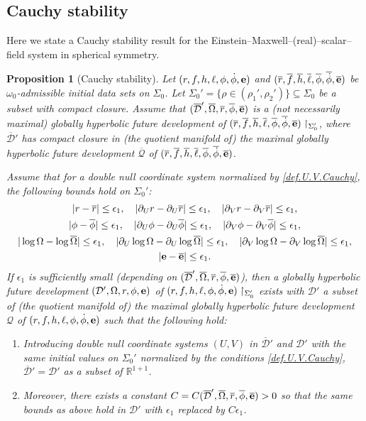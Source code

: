 \documentclass[10pt, reqno]{amsart}
\newtheorem{proposition}[theorem]{Proposition}
\theoremstyle{definition}
\theoremstyle{remark}
\theoremstyle{conjecture}
\numberwithin{equation}{section}
\newcommand{\abs}[1]{\vert#1\vert}
\newcommand{\set}[1]{\{#1\}}
\newcommand{\rd}{\partial}
\newcommand{\0}{\emptyset}
\newcommand{\eps}{\epsilon}
\newcommand{\Sgm}{\Sigma}
\newcommand{\omg}{\omega}
\newcommand{\Omg}{\Omega}
\newcommand{\bfe}{{\bf e}}
\newcommand{\calD}{\mathcal D}
\newcommand{\calQ}{\mathcal Q}
\newcommand{\e}{\bfe}							%
\newcommand{\Omgbg}{\overline{\Omg}}				%
\newcommand{\phibg}{\overline{\phi}}				%
\newcommand{\rbg}{\overline{r}}					%
\newcommand{\ebg}{\overline{\e}}					%
\newcommand{\fbg}{\overline{f}}
\newcommand{\hbg}{\overline{h}}
\newcommand{\ellbg}{\overline{\ell}}
\newcommand{\dphibg}{\overline{\dot{\phi}}}
\begin{document}
\subsection{Cauchy stability} \label{subsec:cauchy-st}
Here we state a Cauchy stability result for the Einstein--Maxwell--(real)--scalar--field system in spherical symmetry.
\begin{proposition}[Cauchy stability] \label{prop:cauchy-st}
Let $(r, f, h, \ell, \phi, \dot{\phi}, \e)$ and $(\rbg, \fbg, \hbg, \ellbg, \phibg, \dphibg, \ebg)$ be $\omg_0$-admissible initial data sets on $\Sgm_{0}$. Let $\Sgm_{0}' = \set{ \rho \in (\rho_{1}', \rho_{2}')} \subseteq \Sigma_0$ be a subset with compact closure. Assume that $(\overline{\calD}', \Omgbg, \rbg, \phibg, \ebg)$ is a (not necessarily maximal) globally hyperbolic future development of $(\rbg, \fbg, \hbg, \ellbg, \phibg, \dphibg, \ebg)\restriction_{\Sigma_0'}$, where $\overline{\calD}'$ has compact closure in (the quotient manifold of) the maximal globally hyperbolic future development $\overline{\calQ}$ of $(\rbg, \fbg, \hbg, \ellbg, \phibg, \dphibg, \ebg)$.

Assume that for a double null coordinate system normalized by \eqref{def.U.V.Cauchy},
the following bounds hold on $\Sgm_{0}'$:
\begin{equation} \label{eq:cauchy-st}
\begin{gathered}
\abs{r - \rbg} \leq \eps_{1}, \quad
\abs{\rd_{U} r - \rd_{U} \rbg} \leq \eps_{1}, \quad 
\abs{\rd_{V} r - \rd_{V} \rbg} \leq \eps_{1}, \\
\abs{\phi - \phibg} \leq \eps_{1}, \quad
\abs{\rd_{U} \phi - \rd_{U} \phibg} \leq \eps_{1}, \quad 
\abs{\rd_{V} \phi - \rd_{V} \phibg} \leq \eps_{1}, \\
\abs{\log \Omg - \log \Omgbg} \leq \eps_{1}, \quad
\abs{\rd_{U} \log \Omg - \rd_{U} \log \Omgbg} \leq \eps_{1}, \quad 
\abs{\rd_{V} \log \Omg - \rd_{V} \log \Omgbg} \leq \eps_{1}, \\
\abs{\e - \ebg} \leq \eps_{1}.
\end{gathered}
\end{equation}
If $\eps_{1}$ is sufficiently small (depending on $(\overline{\calD}', \Omgbg, \rbg, \phibg, \ebg)$), then a globally hyperbolic future development $(\calD',\Omg, r, \phi, \e)$ of $(r, f, h, \ell, \phi, \dot{\phi}, \e)\restriction_{\Sigma_0'}$ exists with $\calD'$ a subset of (the quotient manifold of) the maximal globally hyperbolic future development $\calQ$ of $(r, f, h, \ell, \phi, \dot{\phi}, \e)$ such that the following hold:
\begin{enumerate}
\item Introducing double null coordinate systems $(U, V)$ in $\overline{\calD}'$ and $\calD'$ with the same initial values on $\Sigma_0'$ normalized by the conditions \eqref{def.U.V.Cauchy}, $\overline{\calD}'=\calD'$ as a subset of $\mathbb R^{1+1}$.
\item Moreover, there exists a constant $C = C(\overline{\calD}', \Omgbg, \rbg, \phibg, \ebg) > 0$ so that the same bounds as above hold in $\calD'$ with $\eps_{1}$ replaced by $C \eps_{1}$.
\end{enumerate}
\end{proposition}
\end{document}
